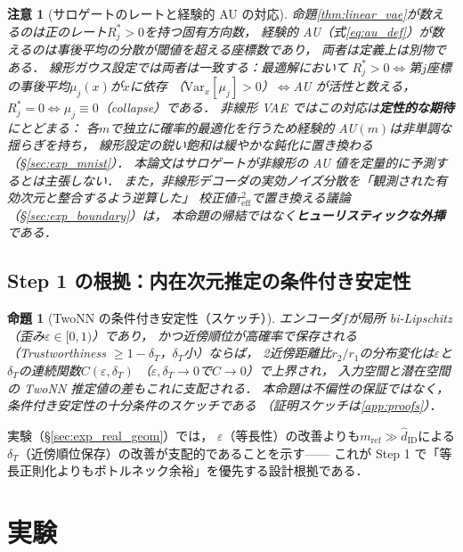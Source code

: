 \documentclass[11pt,a4paper]{jsarticle}
\newtheorem{proposition}{命題}
\newtheorem{remark}{注意}
\newcommand{\hatdID}{\hat{d}_{\mathrm{ID}}}
\begin{document}
\begin{remark}[サロゲートのレートと経験的 AU の対応]\label{rem:bridge}
命題\ref{thm:linear_vae}が数えるのは正のレート$R_j^* > 0$を持つ固有方向数，
経験的 AU（式\eqref{eq:au_def}）が数えるのは事後平均の分散が閾値を超える座標数であり，
両者は定義上は別物である．
線形ガウス設定では両者は一致する：最適解において
$R_j^* > 0 \iff$第$j$座標の事後平均$\mu_j(x)$が$x$に依存
（$\mathrm{Var}_x[\mu_j] > 0$）$\iff$AU が活性と数える，
$R_j^* = 0 \iff \mu_j \equiv 0$（collapse）である．
非線形 VAE ではこの対応は\textbf{定性的な期待}にとどまる：
各$m$で独立に確率的最適化を行うため経験的 AU$(m)$は非単調な揺らぎを持ち，
線形設定の鋭い飽和は緩やかな鈍化に置き換わる（§\ref{sec:exp_mnist}）．
本論文はサロゲートが非線形の AU 値を定量的に予測するとは主張しない．
また，非線形デコーダの実効ノイズ分散を「観測された有効次元と整合するよう逆算した」
校正値$\tau^2_{\mathrm{eff}}$で置き換える議論（§\ref{sec:exp_boundary}）は，
本命題の帰結ではなく\textbf{ヒューリスティックな外挿}である．
\end{remark}

\subsection{Step 1 の根拠：内在次元推定の条件付き安定性}\label{sec:theory_twonn}

\begin{proposition}[TwoNN の条件付き安定性（スケッチ）]\label{thm:twonn_stability}
エンコーダ$f$が局所 bi-Lipschitz（歪み$\varepsilon \in [0,1)$）であり，
かつ近傍順位が高確率で保存される（Trustworthiness $\geq 1 - \delta_T$，$\delta_T$小）ならば，
2近傍距離比$r_2/r_1$の分布変化は$\varepsilon$と$\delta_T$の連続関数$C(\varepsilon, \delta_T)$
（$\varepsilon, \delta_T \to 0$で$C \to 0$）で上界され，
入力空間と潜在空間の TwoNN 推定値の差もこれに支配される．
本命題は不偏性の保証ではなく，条件付き安定性の十分条件のスケッチである
（証明スケッチは\ref{app:proofs}）．
\end{proposition}

実験（§\ref{sec:exp_real_geom}）では，
$\varepsilon$（等長性）の改善よりも$m_{\mathrm{ref}} \gg \hatdID$による
$\delta_T$（近傍順位保存）の改善が支配的であることを示す——
これが Step 1 で「等長正則化よりもボトルネック余裕」を優先する設計根拠である．

\section{実験}\label{sec:exp}
\end{document}

